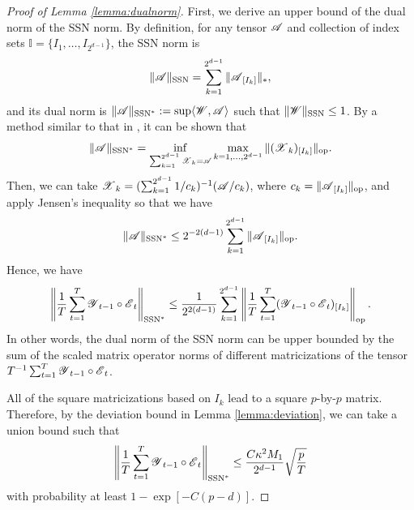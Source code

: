 \documentclass[12pt]{article}
\newcommand{\cm}[1]{\mbox{\boldmath$\mathscr{#1}$}}
\begin{document}
\begin{proof}[Proof of Lemma \ref{lemma:dualnorm}]
	First, we derive an upper bound of the dual norm of the SSN norm. By definition, for any tensor $\cm{A}$ and collection of index sets $\mathbb{I}=\{I_1,\dots,I_{2^{d-1}}\}$, the SSN norm is
	\begin{equation}
	\|\cm{A}\|_{\text{SSN}}=\sum_{k=1}^{2^{d-1}}\|\cm{A}_{[I_k]}\|_*,
	\end{equation}
	and its dual norm is $\|\cm{A}\|_{\text{SSN}^*}:=\sup\langle\cm{W},\cm{A}\rangle$ such that $\|\cm{W}\|_{\text{SSN}}\leq1$. By a method similar to that in  \cite{tomioka2011statistical}, it can be shown that 
	\begin{equation}
	\|\cm{A}\|_{\text{SSN}^*}=\inf_{\sum_{k=1}^{2^{d-1}}\scalebox{0.7}{\cm{X}}_k=\scalebox{0.7}{\cm{A}}}\max_{k=1,\dots,2^{d-1}}\|(\cm{X}_k)_{[I_k]}\|_{\text{op}}.
	\end{equation}
	Then, we can take $\cm{X}_k=(\sum_{k=1}^{2^{d-1}}1/c_k)^{-1}(\cm{A}/c_k)$, where $c_k=\|\cm{A}_{[I_k]}\|_{\text{op}}$, and apply Jensen's inequality so that we have
	\begin{equation}
	\|\cm{A}\|_{\text{SSN}^*}\leq2^{-2(d-1)}\sum_{k=1}^{2^{d-1}}\|\cm{A}_{[I_k]}\|_{\text{op}}.
	\end{equation}
	Hence, we have
	\begin{equation}
	\left\|\frac{1}{T}\sum_{t=1}^T\cm{Y}_{t-1}\circ\cm{E}_t\right\|_{\text{SSN}^*}\leq\frac{1}{2^{2(d-1)}}\sum_{k=1}^{2^{d-1}}\left\|\frac{1}{T}\sum_{t=1}^T(\cm{Y}_{t-1}\circ\cm{E}_t)_{[I_k]}\right\|_{\text{op}}.
	\end{equation}
	In other words, the dual norm of the SSN norm can be upper bounded by the sum of the scaled matrix operator norms of different matricizations of the tensor $T^{-1}\sum_{t=1}^T\cm{Y}_{t-1}\circ\cm{E}_t$.
	
	All of the square matricizations based on $I_k$ lead to a square $p$-by-$p$ matrix. Therefore, by the deviation bound in Lemma \ref{lemma:deviation}, we can take a union bound such that
	\begin{equation}
	\left\|\frac{1}{T}\sum_{t=1}^T\cm{Y}_{t-1}\circ\cm{E}_t\right\|_{\text{SSN}^*}\leq \frac{C\kappa^2 M_1}{2^{d-1}}\sqrt{\frac{p}{T}}
	\end{equation}
	with probability at least $1-\exp[-C(p-d)]$.
	
	

\end{proof}
\end{document}
